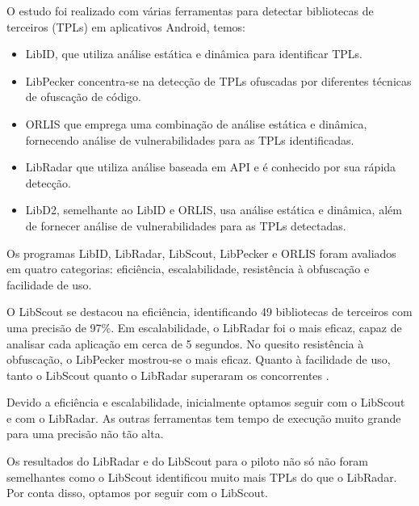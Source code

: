 O estudo foi realizado com várias ferramentas para detectar bibliotecas de terceiros (TPLs) em aplicativos Android, temos: 
\begin{itemize}
  \item LibID, que utiliza análise estática e dinâmica para identificar TPLs. 
  \item LibPecker concentra-se na detecção de TPLs ofuscadas por diferentes técnicas de ofuscação de código. 
  \item ORLIS que emprega uma combinação de análise estática e dinâmica, fornecendo análise de vulnerabilidades para as TPLs identificadas. 
  \item LibRadar que utiliza análise baseada em API e é conhecido por sua rápida detecção. 
  \item LibD2, semelhante ao LibID e ORLIS, usa análise estática e dinâmica, além de fornecer análise de vulnerabilidades para as TPLs detectadas. 
\end{itemize}
  
Os programas LibID, LibRadar, LibScout, LibPecker e ORLIS foram avaliados em quatro categorias: eficiência, escalabilidade, resistência à obfuscação e facilidade de uso. 

O LibScout se destacou na eficiência, identificando 49 bibliotecas de terceiros com uma precisão de 97\%. 
Em escalabilidade, o LibRadar foi o mais eficaz, capaz de analisar cada aplicação em cerca de 5 segundos. 
No quesito resistência à obfuscação, o LibPecker mostrou-se o mais eficaz. 
Quanto à facilidade de uso, tanto o LibScout quanto o LibRadar superaram os concorrentes \cite{api_tpl_zhang}.

Devido a eficiência e escalabilidade, inicialmente optamos seguir com o LibScout e com o LibRadar. As outras ferramentas tem tempo de execução muito grande para uma precisão não tão alta.

Os resultados do LibRadar e do LibScout para o piloto não só não foram semelhantes como o LibScout identificou muito mais TPLs do que o LibRadar. Por conta disso, optamos por seguir com o LibScout.


